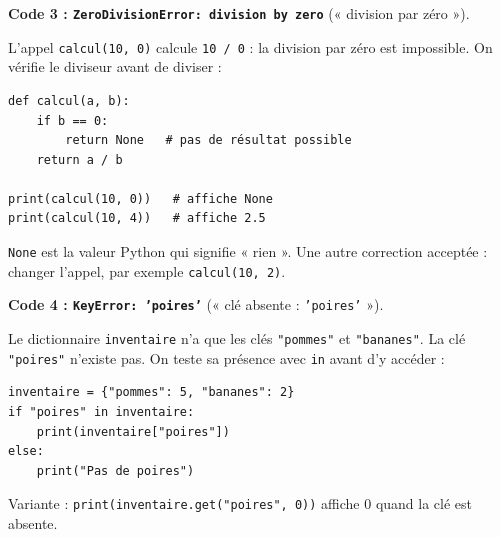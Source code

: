 \documentclass[addpoints, 11pt]{exam}
\newcommand{\code}[1]{\texttt{#1}}
\DeclareRobustCommand{\_}{\textunderscore\allowbreak}
\begin{document}
\begin{questions}
\textbf{Code 3 : \code{ZeroDivisionError: division by zero}} (« division par zéro »).
\begin{reponse}
L'appel \code{calcul(10, 0)} calcule \code{10 / 0} : la division par zéro est impossible. On vérifie le diviseur avant de diviser :
\begin{lstlisting}
def calcul(a, b):
    if b == 0:
        return None   # pas de résultat possible
    return a / b

print(calcul(10, 0))   # affiche None
print(calcul(10, 4))   # affiche 2.5
\end{lstlisting}
\end{reponse}
\code{None} est la valeur Python qui signifie « rien ». Une autre correction acceptée : changer l'appel, par exemple \code{calcul(10, 2)}.

\textbf{Code 4 : \code{KeyError: 'poires'}} (« clé absente : \code{'poires'} »).
\begin{reponse}
Le dictionnaire \code{inventaire} n'a que les clés \code{"pommes"} et \code{"bananes"}. La clé \code{"poires"} n'existe pas. On teste sa présence avec \code{in} avant d'y accéder :
\begin{lstlisting}
inventaire = {"pommes": 5, "bananes": 2}
if "poires" in inventaire:
    print(inventaire["poires"])
else:
    print("Pas de poires")
\end{lstlisting}
\end{reponse}
Variante : \code{print(inventaire.get("poires", 0))} affiche 0 quand la clé est absente.

\end{questions}
\end{document}
